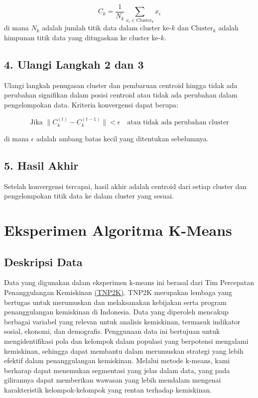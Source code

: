 \documentclass[
  oneside]{book}
\begin{document}
\[
C_k = \frac{1}{N_k} \sum_{x_i \in \text{Cluster}_k} x_i
\]
di mana \(N_k\) adalah jumlah titik data dalam cluster ke-\(k\) dan \(\text{Cluster}_k\) adalah himpunan titik data yang ditugaskan ke cluster ke-\(k\).

\subsection*{4. Ulangi Langkah 2 dan 3}\label{ulangi-langkah-2-dan-3}

Ulangi langkah penugasan cluster dan pembaruan centroid hingga tidak ada perubahan signifikan dalam posisi centroid atau tidak ada perubahan dalam pengelompokan data. Kriteria konvergensi dapat berupa:

\[
\text{Jika } \| C_k^{(t)} - C_k^{(t-1)} \| < \epsilon \quad \text{atau tidak ada perubahan cluster}
\]

di mana \(\epsilon\) adalah ambang batas kecil yang ditentukan sebelumnya.

\subsection*{5. Hasil Akhir}\label{hasil-akhir}

Setelah konvergensi tercapai, hasil akhir adalah centroid dari setiap cluster dan pengelompokan titik data ke dalam cluster yang sesuai.

\section{Eksperimen Algoritma K-Means}\label{eksperimen-algoritma-k-means}

\subsection*{Deskripsi Data}\label{deskripsi-data}

Data yang digunakan dalam eksperimen k-means ini berasal dari Tim Percepatan Penanggulangan Kemiskinan \href{https://www.tnp2k.go.id/}{(TNP2K)}. TNP2K merupakan lembaga yang bertugas untuk merumuskan dan melaksanakan kebijakan serta program penanggulangan kemiskinan di Indonesia. Data yang diperoleh mencakup berbagai variabel yang relevan untuk analisis kemiskinan, termasuk indikator sosial, ekonomi, dan demografis. Penggunaan data ini bertujuan untuk mengidentifikasi pola dan kelompok dalam populasi yang berpotensi mengalami kemiskinan, sehingga dapat membantu dalam merumuskan strategi yang lebih efektif dalam penanggulangan kemiskinan. Melalui metode k-means, kami berharap dapat menemukan segmentasi yang jelas dalam data, yang pada gilirannya dapat memberikan wawasan yang lebih mendalam mengenai karakteristik kelompok-kelompok yang rentan terhadap kemiskinan.
\end{document}
